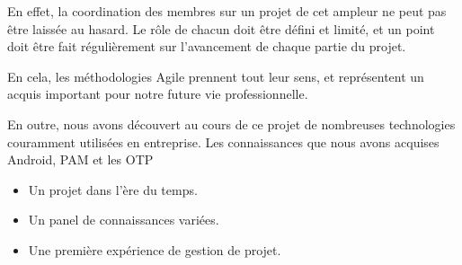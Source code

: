 En effet, la coordination des membres sur un projet de cet ampleur ne peut pas être laissée au hasard. Le rôle de chacun doit être défini et limité, et un point doit être fait régulièrement sur l'avancement de chaque partie du projet.

En cela, les méthodologies Agile prennent tout leur sens, et représentent un acquis important pour notre future vie professionnelle.

En outre, nous avons découvert au cours de ce projet de nombreuses technologies couramment utilisées en entreprise. Les connaissances que nous avons acquises Android, PAM et les OTP 
\begin{itemize}
\item Un projet dans l'ère du temps.
\item Un panel de connaissances variées.
\item Une première expérience de gestion de projet.
\end{itemize}
